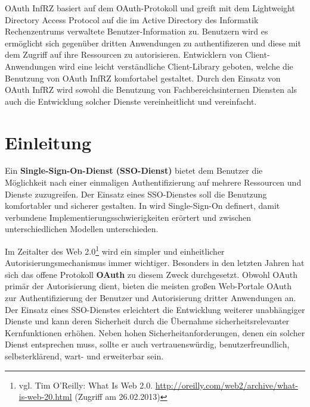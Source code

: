 \documentclass[12pt,a4paper,pointednumbers,abstracton]{scrartcl}
\begin{document}
OAuth InfRZ basiert auf dem OAuth-Protokoll und greift mit dem Lightweight Directory Access Protocol auf die im Active Directory des Informatik Rechenzentrums verwaltete Benutzer-Information zu.
Benutzern wird es ermöglicht sich gegenüber dritten Anwendungen zu authentifizeren und diese mit dem Zugriff auf ihre Ressourcen zu autorisieren.
Entwicklern von Client-Anwendungen wird eine leicht verständliche Client-Library geboten, welche die Benutzung von OAuth InfRZ komfortabel gestaltet.
Durch den Einsatz von OAuth InfRZ wird sowohl die Benutzung von Fachbereichsinternen Diensten als auch die Entwicklung solcher Dienste vereinheitlicht und vereinfacht.

\newpage
\tableofcontents

\newpage
{}
\setcounter{page}{1}
\section{Einleitung}
\label{sec:einleitung}

Ein \textbf{Single-Sign-On-Dienst (SSO-Dienst)} bietet dem Benutzer die Möglichkeit nach einer einmaligen Authentifizierung auf mehrere Ressourcen und Dienste zuzugreifen.
Der Einsatz eines SSO-Dienstes soll die Benutzung komfortabler und sicherer gestalten.
In \cite{Hur97} wird Single-Sign-On definert, damit verbundene Implementierungsschwierigkeiten erörtert und zwischen unterschiedlichen Modellen unterschieden.

Im Zeitalter des Web 2.0\footnote{vgl. Tim O'Reilly: What Is Web 2.0. \url{http://oreilly.com/web2/archive/what-is-web-20.html} (Zugriff am 26.02.2013)} wird ein simpler und einheitlicher Autorisierungsmechanismus immer wichtiger.
Besonders in den letzten Jahren hat sich das offene Protokoll \textbf{OAuth} zu diesem Zweck durchgesetzt.
Obwohl OAuth primär der Autorisierung dient, bieten die meisten großen Web-Portale OAuth zur Authentifizierung der Benutzer und Autorisierung dritter Anwendungen an.
Der Einsatz eines SSO-Dienstes erleichtert die Entwicklung weiterer unabhängiger Dienste und kann deren Sicherheit durch die Übernahme sicherheitsrelevanter Kernfunktionen erhöhen.
Neben hohen Sicherheitanforderungen, denen ein solcher Dienst entsprechen muss, sollte er auch vertrauenswürdig, benutzerfreundlich, selbsterklärend, wart- und erweiterbar sein.
\end{document}
